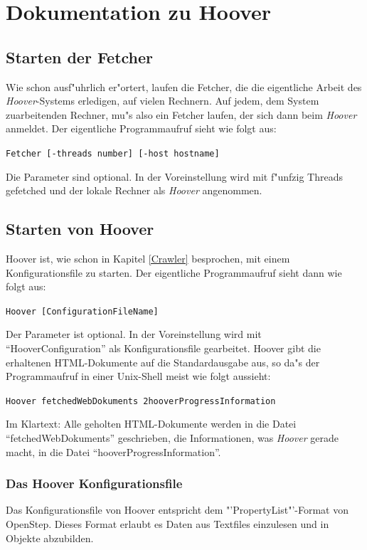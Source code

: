 \chapter{Dokumentation zu Hoover}
\label{DokumentationHooverCrawler}

\section{Starten der Fetcher}
Wie schon ausf"uhrlich er"ortert, laufen die Fetcher, die die eigentliche Arbeit des {\em Hoover}-Systems erledigen, auf vielen Rechnern. Auf jedem, dem System zuarbeitenden Rechner, mu"s also ein Fetcher laufen, der sich dann beim {\em Hoover} anmeldet.
Der eigentliche Programmaufruf sieht wie folgt aus:
\begin{center}
{\tt \small Fetcher [-threads \flq number\frq ] [-host \flq hostname\frq ]}
\end{center}
Die Parameter sind optional. In der Voreinstellung wird mit f"unfzig Threads gefetched und der lokale Rechner als {\em Hoover} angenommen.


\section{Starten von Hoover}

Hoover ist, wie schon in Kapitel \ref{Crawler} besprochen, mit einem Konfigurationsfile zu starten. Der eigentliche Programmaufruf sieht dann wie folgt aus:
\begin{center}
{\tt \small Hoover [ConfigurationFileName]}
\end{center}
Der Parameter ist optional. In der Voreinstellung wird mit "`HooverConfiguration"' als Konfigurationsfile gearbeitet. Hoover gibt die erhaltenen HTML-Dokumente auf die Standardausgabe aus, so da"s der Programmaufruf in einer Unix-Shell meist wie folgt aussieht:
\begin{center}
{\tt \small Hoover \frq fetchedWebDokuments 2\frq hooverProgressInformation }
\end{center}
Im Klartext: Alle geholten HTML-Dokumente werden in die Datei "`fetchedWebDokuments"' geschrieben, die Informationen, was {\em Hoover} gerade macht, in die Datei "`hooverProgressInformation"'.


\subsection{Das Hoover Konfigurationsfile}

Das Konfigurationsfile von Hoover entspricht dem "'PropertyList"'-Format von OpenStep. Dieses Format erlaubt es Daten aus Textfiles einzulesen und in Objekte abzubilden.

